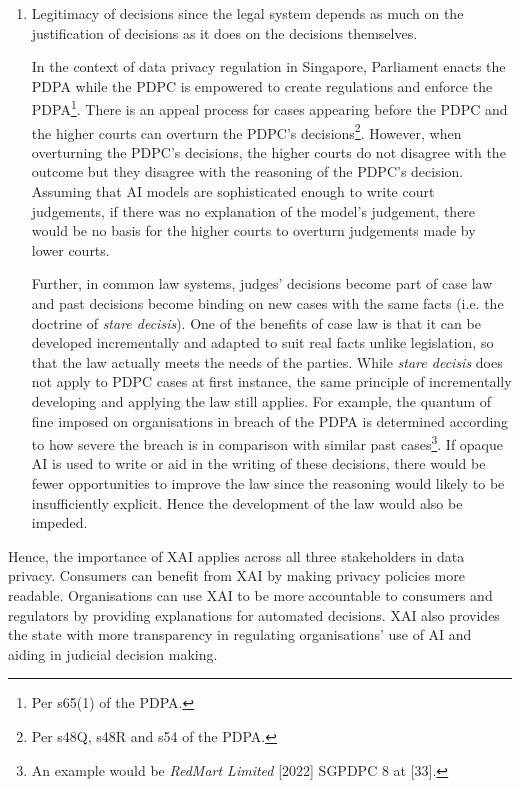 \begin{enumerate}
  \item Legitimacy of decisions since the legal system depends as much on the justification of decisions as it does on the decisions themselves.
  
  In the context of data privacy regulation in Singapore, Parliament enacts the PDPA while the PDPC is empowered to create regulations and enforce the PDPA\footnote{Per s65(1) of the PDPA.}. There is an appeal process for cases appearing before the PDPC and the higher courts can overturn the PDPC's decisions\footnote{Per s48Q, s48R and s54 of the PDPA.}. However, when overturning the PDPC's decisions, the higher courts do not disagree with the outcome but they disagree with the reasoning of the PDPC's decision. Assuming that AI models are sophisticated enough to write court judgements, if there was no explanation of the model's judgement, there would be no basis for the higher courts to overturn judgements made by lower courts. 
  
  Further, in common law systems, judges' decisions become part of case law and past decisions become binding on new cases with the same facts (i.e. the doctrine of \textit{stare decisis}). One of the benefits of case law is that it can be developed incrementally and adapted to suit real facts unlike legislation, so that the law actually meets the needs of the parties. While \textit{stare decisis} does not apply to PDPC cases at first instance, the same principle of incrementally developing and applying the law still applies. For example, the quantum of fine imposed on organisations in breach of the PDPA is determined according to how severe the breach is in comparison with similar past cases\footnote{An example would be \textit{RedMart Limited} [2022] SGPDPC 8 at [33].}. If opaque AI is used to write or aid in the writing of these decisions, there would be fewer opportunities to improve the law since the reasoning would likely to be insufficiently explicit. Hence the development of the law would also be impeded.
\end{enumerate}

Hence, the importance of XAI applies across all three stakeholders in data privacy. Consumers can benefit from XAI by making privacy policies more readable. Organisations can use XAI to be more accountable to consumers and regulators by providing explanations for automated decisions. XAI also provides the state with more transparency in regulating organisations' use of AI and aiding in judicial decision making.

